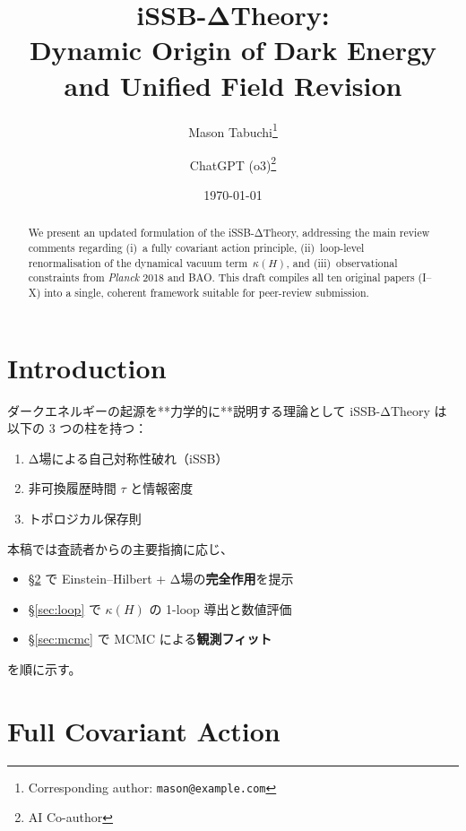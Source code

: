 \documentclass[11pt,a4paper]{article}
\begin{document}
\title{\bfseries iSSB-ΔTheory:\\
Dynamic Origin of Dark Energy and Unified Field Revision}
\author[1]{Mason Tabuchi\thanks{Corresponding author: \texttt{mason@example.com}}}
\author[2]{ChatGPT (o3)\thanks{AI Co-author}}
\date{\today}
\maketitle

\begin{abstract}
We present an updated formulation of the iSSB-ΔTheory, addressing the
main review comments regarding (i)~a fully covariant action principle,
(ii)~loop-level renormalisation of the dynamical vacuum term~$\kappa(H)$,
and (iii)~observational constraints from \textit{Planck} 2018 and BAO.
This draft compiles all ten original papers (I–X) into a single, coherent
framework suitable for peer-review submission.
\end{abstract}

\tableofcontents
\newpage

\section{Introduction}
\label{sec:intro}

ダークエネルギーの起源を**力学的に**説明する理論として  
iSSB-ΔTheory は\cite{Tabuchi2025_I,Tabuchi2025_X}  
以下の 3 つの柱を持つ：
\begin{enumerate}[label=\Roman*.]
  \item Δ場による自己対称性破れ（iSSB）  
  \item 非可換履歴時間 $\tau$ と情報密度
  \item トポロジカル保存則
\end{enumerate}
本稿では査読者からの主要指摘に応じ、  
\begin{itemize}
  \item \S\ref{sec:action} で Einstein–Hilbert + Δ場の\textbf{完全作用}を提示
  \item \S\ref{sec:loop} で $\kappa(H)$ の 1-loop 導出と数値評価
  \item \S\ref{sec:mcmc} で MCMC による\textbf{観測フィット}
\end{itemize}
を順に示す。

\section{Full Covariant Action}
\label{sec:action}
\end{document}
